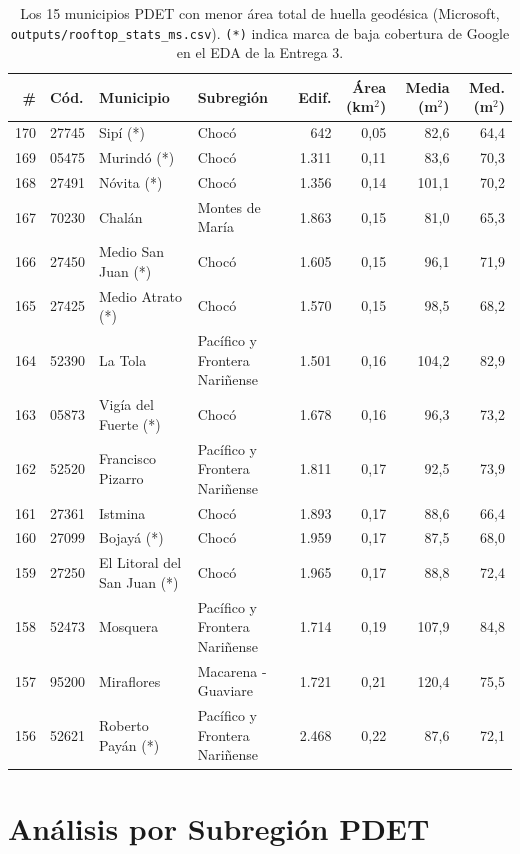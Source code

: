 \documentclass[11pt, a4paper]{article}
\begin{document}
\begin{table}[H]
\footnotesize
\setlength{\tabcolsep}{3.5pt}
\centering
\begin{tabular}{rlp{3.2cm}p{3.3cm}rrrr}
\toprule
\textbf{\#} & \textbf{Cód.} & \textbf{Municipio} & \textbf{Subregión} & \textbf{Edif.} & \textbf{Área (km$^2$)} & \textbf{Media (m$^2$)} & \textbf{Med. (m$^2$)} \\
\midrule
170 & 27745 & Sipí (*) & Chocó & 642 & 0,05 & 82,6 & 64,4 \\
169 & 05475 & Murindó (*) & Chocó & 1.311 & 0,11 & 83,6 & 70,3 \\
168 & 27491 & Nóvita (*) & Chocó & 1.356 & 0,14 & 101,1 & 70,2 \\
167 & 70230 & Chalán & Montes de María & 1.863 & 0,15 & 81,0 & 65,3 \\
166 & 27450 & Medio San Juan (*) & Chocó & 1.605 & 0,15 & 96,1 & 71,9 \\
165 & 27425 & Medio Atrato (*) & Chocó & 1.570 & 0,15 & 98,5 & 68,2 \\
164 & 52390 & La Tola & Pacífico y Frontera Nariñense & 1.501 & 0,16 & 104,2 & 82,9 \\
163 & 05873 & Vigía del Fuerte (*) & Chocó & 1.678 & 0,16 & 96,3 & 73,2 \\
162 & 52520 & Francisco Pizarro & Pacífico y Frontera Nariñense & 1.811 & 0,17 & 92,5 & 73,9 \\
161 & 27361 & Istmina & Chocó & 1.893 & 0,17 & 88,6 & 66,4 \\
160 & 27099 & Bojayá (*) & Chocó & 1.959 & 0,17 & 87,5 & 68,0 \\
159 & 27250 & El Litoral del San Juan (*) & Chocó & 1.965 & 0,17 & 88,8 & 72,4 \\
158 & 52473 & Mosquera & Pacífico y Frontera Nariñense & 1.714 & 0,19 & 107,9 & 84,8 \\
157 & 95200 & Miraflores & Macarena - Guaviare & 1.721 & 0,21 & 120,4 & 75,5 \\
156 & 52621 & Roberto Payán (*) & Pacífico y Frontera Nariñense & 2.468 & 0,22 & 87,6 & 72,1 \\
\bottomrule
\end{tabular}
\caption{Los 15 municipios PDET con menor área total de huella geodésica (Microsoft, \texttt{outputs/rooftop\_stats\_ms.csv}). \texttt{(*)} indica marca de baja cobertura de Google en el EDA de la Entrega 3.}
\label{tab:bottom15}
\end{table}

\newpage
\section{Análisis por Subregión PDET}
\end{document}
